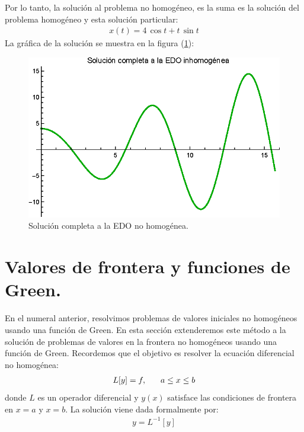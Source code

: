 \begin{ejemplo}
Por lo tanto, la solución al problema no homogéneo, es la suma es la solución del problema homogéneo y esta solución particular:
\begin{align*}
x (t) = 4 \, \cos t + t \, \sin t
\end{align*}
La gráfica de la solución se muestra en la figura (\ref{fig:figura_02}):
\begin{figure}[H]
    \centering
    \includegraphics[scale=1]{Imagenes/Plot_Oscilador_Forzado_Green_02.eps}
    \caption{Solución completa a la EDO no homogénea.}
    \label{fig:figura_02}
\end{figure}

\end{ejemplo}

\section{Valores de frontera y funciones de Green.}

En el numeral anterior, resolvimos problemas de valores iniciales no homogéneos usando una función de Green. En esta sección extenderemos este método a la solución de problemas de valores en la frontera no homogéneos usando una función de Green. Recordemos que el objetivo es resolver la ecuación diferencial no homogénea:
\begin{align*}
L [y] = f, \hspace{0.6cm} a \leq x \leq b
\end{align*}
donde $L$ es un operador diferencial y $y (x)$ satisface las condiciones de frontera en $x = a$ y $x = b$. La solución viene dada formalmente por:
\begin{align*}
y = L^{-1} [y]
\end{align*}

